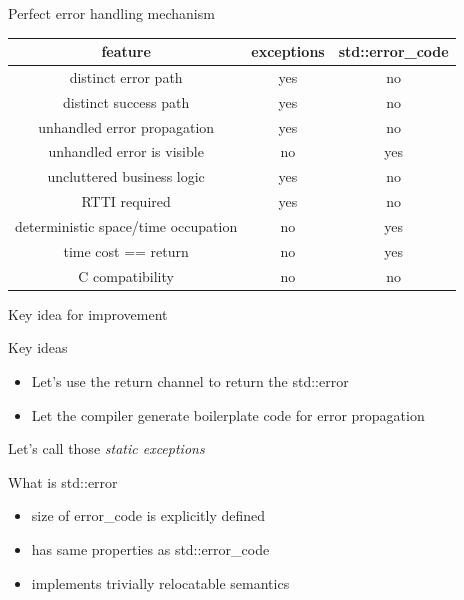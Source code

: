 \documentclass[10pt]{beamer}
\begin{document}
\begin{frame}{Perfect error handling mechanism}
	\centering
	\begin{tabular}{|c|c|c|}
		\hline
		feature & exceptions & std::error\_code \\ \hline \hline
		distinct error path & yes & no \\ \hline
		distinct success path & yes & no \\ \hline \hline
		unhandled error propagation & yes & no \\ \hline
		unhandled error is visible & no & yes \\ \hline
		uncluttered business logic & yes & no \\ \hline \hline
		RTTI required & yes & no \\ \hline
		deterministic space/time occupation & no & yes \\ \hline
		time cost == return & no & yes \\ \hline \hline
		C compatibility & no & no \\ \hline
	\end{tabular}
\end{frame}

\begin{frame}{Key idea for improvement}
	\begin{block}{Key ideas}
		\begin{itemize}[<+- | alert@+>]
			\item Let's use the return channel to return the std::error
			\item Let the compiler generate boilerplate code for error propagation
		\end{itemize}
	\end{block}
	Let's call those \emph{\color{amethyst}static exceptions}
\end{frame}
	
\begin{frame}{What is std::error}
	\begin{itemize}
		\item size of error\_code is explicitly defined
		\item has same properties as std::error\_code
		\item implements trivially relocatable semantics
	\end{itemize}
\end{frame}
	
\end{document}
